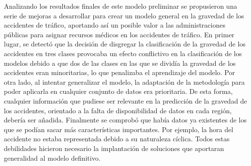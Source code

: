 

Analizando los resultados finales de este modelo preliminar se propusieron una serie de mejoras a desarrollar para crear un modelo general en la gravedad de los accidentes de tráfico, aportando así un posible valor a las administraciones públicas para asignar recursos médicos en los accidentes de tráfico. En primer lugar, se detectó que la decisión de disgregar la clasificación de la gravedad de los accidentes en tres clases provocaba un efecto conflictivo en la clasificación de los modelos debido a que dos de las clases en las que se dividía la gravedad de los accidentes eran minoritarias, lo que penalizaba el aprendizaje del modelo. Por otra lado, al intentar generalizar el modelo, la adaptación de la metodología para poder aplicarla en cualquier conjunto de datos era prioritaria. De esta forma, cualquier información que pudiese ser relevante en la predicción de la gravedad de los accidentes, orientado a la falta de disponibilidad de datos en cada región, debería ser añadida. Finalmente se comprobó que había datos ya existentes de los que se podían sacar más características importantes. Por ejemplo, la hora del accidente no estaba representada debido a su naturaleza cíclica. Todos estas debilidades hicieron necesario la implantación de soluciones que aportaran generalidad al modelo definitivo.



